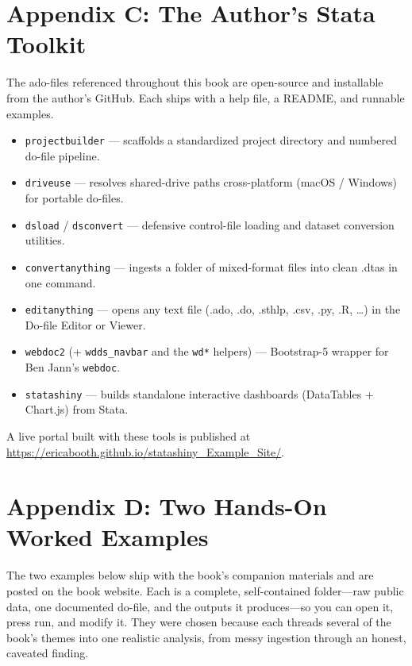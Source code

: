 \documentclass[
    a4paper,
    fontsize=10pt,
    twoside=true,
    numbers=noenddot,
]{kaobook}
\providecommand{\Option}[1]{\textsf{#1}}
\begin{document}
\chapter*{Appendix C: The Author's Stata Toolkit}
The ado-files referenced throughout this book are open-source and installable from the author's GitHub. Each ships with a help file, a README, and runnable examples.
\begin{itemize}
    \item \texttt{projectbuilder} --- scaffolds a standardized project directory and numbered do-file pipeline.
    \item \texttt{driveuse} --- resolves shared-drive paths cross-platform (macOS / Windows) for portable do-files.
    \item \texttt{dsload} / \texttt{dsconvert} --- defensive control-file loading and dataset conversion utilities.
    \item \texttt{convertanything} --- ingests a folder of mixed-format files into clean \Option{.dta}s in one command.
    \item \texttt{editanything} --- opens any text file (\Option{.ado}, \Option{.do}, \Option{.sthlp}, \Option{.csv}, \Option{.py}, \Option{.R}, \dots) in the Do-file Editor or Viewer.
    \item \texttt{webdoc2} (+ \texttt{wdds\_navbar} and the \texttt{wd*} helpers) --- Bootstrap-5 wrapper for Ben Jann's \texttt{webdoc}.
    \item \texttt{statashiny} --- builds standalone interactive dashboards (DataTables + Chart.js) from Stata.
\end{itemize}
A live portal built with these tools is published at \url{https://ericabooth.github.io/statashiny_Example_Site/}.

\chapter*{Appendix D: Two Hands-On Worked Examples}\label{app:examples}
The two examples below ship with the book's companion materials and are posted on the book website. Each is a complete, self-contained folder---raw public data, one documented do-file, and the outputs it produces---so you can open it, press run, and modify it. They were chosen because each threads several of the book's themes into one realistic analysis, from messy ingestion through an honest, caveated finding.
\end{document}
